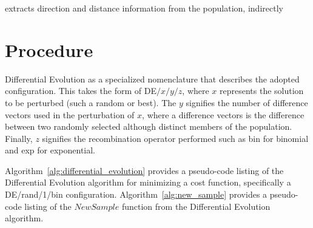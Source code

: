 \documentclass[a4paper, 11pt]{article}
\begin{document}
extracts direction and distance information from the population, indirectly


\section{Procedure}
\label{sec:procedure}
Differential Evolution as a specialized nomenclature that describes the adopted configuration. This takes the form of DE$/x/y/z$, where $x$ represents the solution to be perturbed (such a random or best). The $y$ signifies the number of difference vectors used in the perturbation of $x$, where a difference vectors is the difference between two randomly selected although distinct members of the population. Finally, $z$ signifies the recombination operator performed such as bin for binomial and exp for exponential. 

Algorithm~\ref{alg:differential_evolution} provides a pseudo-code listing of the Differential Evolution algorithm for minimizing a cost function, specifically a DE/rand/1/bin configuration. Algorithm~\ref{alg:new_sample} provides a pseudo-code listing of the $NewSample$ function from the Differential Evolution algorithm.
\end{document}
